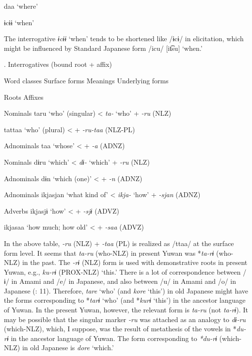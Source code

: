     daa  ‘where’

    ɨcɨɨ  ‘when’

The interrogative \textit{ɨcɨɨ} ‘when’ tends to be shortened like /ɨcɨ/ in elicitation, which might be influenced by Standard Japanese form /icu/ [it͡su] ‘when.’

\begin{styleBeschriftung}
\textmd{. Interrogatives (bound root + affix)}
\end{styleBeschriftung}

Word classes    Surface forms  Meanings      Underlying forms

            Roots    Affixes

Nominals    taru  ‘who’ (singular)    <  \textit{ta-}  ‘who’  +  \textit{{}-ru}  (NLZ)

    tattaa  ‘who’ (plural)    <      +  \textit{{}-ru-taa}  (NLZ-PL)

Adnominals    taa  ‘whose’    <      +  \textit{{}-a} (ADNZ)

Nominals    dɨru  ‘which’    <  \textit{dɨ-}  ‘which’  +  \textit{{}-ru} (NLZ)

Adnominals    dɨn  ‘which (one)’    <      +  \textit{{}-n} (ADNZ)

Adnominals    ikjasjan  ‘what kind of’    <  \textit{ikja-}  ‘how’  +  \textit{{}-sjan} (ADNZ)

Adverbs    ikjasjɨ  ‘how’    <      +  \textit{{}-sjɨ} (ADVZ)

    ikjasaa  ‘how much; how old’    <      +  \textit{{}-saa} (ADVZ)

In the above table, \textit{{}-ru} (NLZ) + \textit{{}-taa} (PL) is realized as /ttaa/ at the surface form level. It seems that \textit{ta-ru} (who-NLZ) in present Yuwan was *\textit{ta-rɨ} (who-NLZ) in the past. The \textit{{}-rɨ} (NLZ) form is used with demonstrative roots in present Yuwan, e.g., \textit{ku-rɨ} (PROX-NLZ) ‘this.’ There is a lot of correspondence between /ɨ/ in Amami and /e/ in Japanese, and also between /u/ in Amami and /o/ in Japanese (\citealt{HirayamaEtAl1966}: 11). Therefore, \textit{tare} ‘who’ (and \textit{kore} ‘this’) in old Japanese might have the forms corresponding to *\textit{tarɨ} ‘who’ (and *\textit{kurɨ} ‘this’) in the ancestor language of Yuwan. In the present Yuwan, however, the relevant form is \textit{ta-ru} (not \textit{ta-rɨ}). It may be possible that the singular marker \textit{-ru} was attached as an analogy to \textit{dɨ-ru} (which-NLZ), which, I suppose, was the result of metathesis of the vowels in *\textit{du-rɨ} in the ancestor language of Yuwan. The form corresponding to \textit{*du-rɨ} (which-NLZ) in old Japanese is \textit{dore} ‘which.’

